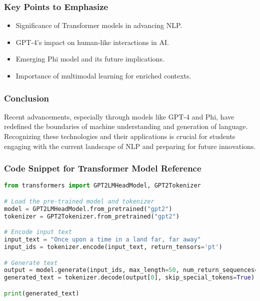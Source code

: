 \documentclass[aspectratio=169]{beamer}
\begin{document}
\begin{frame}
    \frametitle{Key Points to Emphasize}
    \begin{itemize}
        \item Significance of Transformer models in advancing NLP.
        \item GPT-4's impact on human-like interactions in AI.
        \item Emerging Phi model and its future implications.
        \item Importance of multimodal learning for enriched contexts.
    \end{itemize}
\end{frame}

\begin{frame}[fragile]
    \frametitle{Conclusion}
    Recent advancements, especially through models like GPT-4 and Phi, have redefined the boundaries of machine understanding and generation of language. Recognizing these technologies and their applications is crucial for students engaging with the current landscape of NLP and preparing for future innovations.
\end{frame}

\begin{frame}[fragile]
    \frametitle{Code Snippet for Transformer Model Reference}
    \begin{lstlisting}[language=Python]
from transformers import GPT2LMHeadModel, GPT2Tokenizer

# Load the pre-trained model and tokenizer
model = GPT2LMHeadModel.from_pretrained("gpt2")
tokenizer = GPT2Tokenizer.from_pretrained("gpt2")

# Encode input text
input_text = "Once upon a time in a land far, far away"
input_ids = tokenizer.encode(input_text, return_tensors='pt')

# Generate text
output = model.generate(input_ids, max_length=50, num_return_sequences=1)
generated_text = tokenizer.decode(output[0], skip_special_tokens=True)

print(generated_text)
    \end{lstlisting}
\end{frame}
\end{document}
